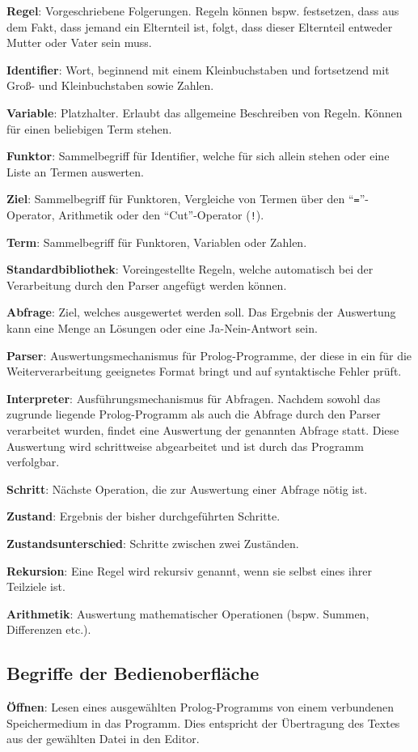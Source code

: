 \documentclass[parskip=full,11pt,twoside]{scrartcl}
\begin{document}
\textbf{Regel}:
Vorgeschriebene Folgerungen. Regeln können bspw. festsetzen, dass aus dem Fakt, dass jemand ein Elternteil ist, folgt, dass dieser Elternteil entweder Mutter oder Vater sein muss.

\textbf{Identifier}:
Wort, beginnend mit einem Kleinbuchstaben und fortsetzend mit Groß- und Kleinbuchstaben sowie Zahlen.

\textbf{Variable}:
Platzhalter. Erlaubt das allgemeine Beschreiben von Regeln. Können für einen beliebigen Term stehen.

\textbf{Funktor}:
Sammelbegriff für Identifier, welche für sich allein stehen oder eine Liste an Termen auswerten.

\textbf{Ziel}:
Sammelbegriff für Funktoren, Vergleiche von Termen über den \enquote{\texttt{=}}-Operator, Arithmetik oder den \enquote{Cut}-Operator (\texttt{!}).

\textbf{Term}:
Sammelbegriff für Funktoren, Variablen oder Zahlen.

\textbf{Standardbibliothek}:
Voreingestellte Regeln, welche automatisch bei der Verarbeitung durch den Parser angefügt werden können.

\textbf{Abfrage}:
Ziel, welches ausgewertet werden soll. Das Ergebnis der Auswertung kann eine Menge an Lösungen oder eine Ja-Nein-Antwort sein.

\textbf{Parser}:
Auswertungsmechanismus für Prolog-Programme, der diese in ein für die Weiterverarbeitung geeignetes Format bringt und auf syntaktische Fehler prüft.

\textbf{Interpreter}:
Ausführungsmechanismus für Abfragen. Nachdem sowohl das zugrunde liegende Prolog-Programm als auch die Abfrage durch den Parser verarbeitet wurden, findet eine Auswertung der genannten Abfrage statt. Diese Auswertung wird schrittweise abgearbeitet und ist durch das Programm verfolgbar.

\textbf{Schritt}:
Nächste Operation, die zur Auswertung einer Abfrage nötig ist.

\textbf{Zustand}:
Ergebnis der bisher durchgeführten Schritte.

\textbf{Zustandsunterschied}:
Schritte zwischen zwei Zuständen.

\textbf{Rekursion}:
Eine Regel wird rekursiv genannt, wenn sie selbst eines ihrer Teilziele ist.

\textbf{Arithmetik}:
Auswertung mathematischer Operationen (bspw. Summen, Differenzen etc.).

\subsection{Begriffe der Bedienoberfläche}
\textbf{Öffnen}:
Lesen eines ausgewählten Prolog-Programms von einem verbundenen Speichermedium in das Programm. Dies entspricht der Übertragung des Textes aus der gewählten Datei in den Editor.
\end{document}
